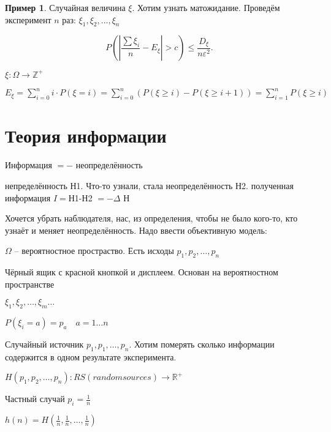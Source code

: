 \documentclass{book}
\newcommand\R{\ensuremath{\mathbb{R}}}
\newcommand\Z{\ensuremath{\mathbb{Z}}}
\theoremstyle{definition}
\newtheorem*{example}{Пример}
\begin{document}
\begin{example}
    Случайная величина  $\xi$. Хотим узнать матожидание. Проведём эксперимент  $n$ раз:  $\xi_1, \xi_2, \ldots, \xi_n$

   \[
       P\left( \left| \frac{\sum \xi_i}{n} - E_{\xi} \right| > c  \right) \leqslant \frac{D_{\xi}}{n\varepsilon^2} 
   .\] 

\end{example}

$\xi:\Omega \to \Z^+$

$E_{\xi} =\sum_{i=0}^{n} i\cdot P\left( \xi=i \right)  = \sum_{i=0}^{n} \left( P\left( \xi\geqslant i \right) -P\left( \xi\geqslant i+1 \right)  \right)  = \sum_{i=1}^{n} P\left( \xi\geqslant i \right) $

\section{Теория информации}

\begin{definition}
$ $\\
    Информация $=-$ неопределённость
\end{definition}

непределённость Н1. Что-то узнали, стала неопределённость Н2. полученная информация  $I = $Н1-Н2  $=-\Delta$ Н

Хочется убрать наблюдателя, нас, из определения, чтобы не было кого-то, кто узнаёт и меняет неопределённость. Надо ввести объективную модель:

    \begin{definition}
        $\Omega$ -- вероятностное простраство. Есть исходы  $p_1, p_2, \ldots, p_n$

        Чёрный ящик с красной кнопкой и дисплеем. Основан на вероятностном пространстве

        $\xi_1, \xi_2, \ldots, \xi_m \ldots$

        $P(\xi_i = a) = p_a\quad a = 1 \ldots n$
    \end{definition}

     Случайный источник $p_1, p_1, \ldots, p_n$. Хотим померять сколько информации содержится в одном результате эксперимента.

     $H\left( p_1, p_2, \ldots, p_n \right) : RS(random sources) \to  \R^+$

     Частный случай $p_i = \frac{1}{n}$ 

     $h(n) = H\left( \frac{1}{n}, \frac{1}{n}, \ldots, \frac{1}{n} \right) $ 
\end{document}

